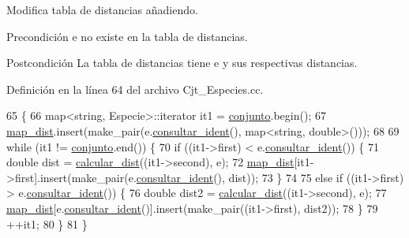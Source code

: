Modifica tabla de distancias añadiendo. 

\begin{DoxyPrecond}{Precondición}
\textquotesingle{}e\textquotesingle{} no existe en la tabla de distancias. 
\end{DoxyPrecond}
\begin{DoxyPostcond}{Postcondición}
La tabla de distancias tiene \textquotesingle{}e\textquotesingle{} y sus respectivas distancias. 
\end{DoxyPostcond}


Definición en la línea 64 del archivo Cjt\+\_\+\+Especies.\+cc.


\begin{DoxyCode}
65 \{
66     map<string, Especie>::iterator it1 = \hyperlink{class_cjt___especies_a82ed53cbd620caca3db6b5c20b37a60a}{conjunto}.begin();
67     \hyperlink{class_cjt___especies_a9b104014aea0c1472ba4e7d7fc785e9a}{map\_dist}.insert(make\_pair(e.\hyperlink{class_especie_a2c3f4a6aa3337ce1fa7e8c7d5be73c50}{consultar\_ident}(), map<string, double>()));    
68 
69     \textcolor{keywordflow}{while} (it1 != \hyperlink{class_cjt___especies_a82ed53cbd620caca3db6b5c20b37a60a}{conjunto}.end()) \{
70         \textcolor{keywordflow}{if} ((it1->first) < e.\hyperlink{class_especie_a2c3f4a6aa3337ce1fa7e8c7d5be73c50}{consultar\_ident}()) \{
71             \textcolor{keywordtype}{double} dist = \hyperlink{class_cjt___especies_a318c7df32ed58b513c623668772c3f84}{calcular\_dist}((it1->second), e);
72             \hyperlink{class_cjt___especies_a9b104014aea0c1472ba4e7d7fc785e9a}{map\_dist}[it1->first].insert(make\_pair(e.\hyperlink{class_especie_a2c3f4a6aa3337ce1fa7e8c7d5be73c50}{consultar\_ident}(), dist));
73         \}
74 
75         \textcolor{keywordflow}{else} \textcolor{keywordflow}{if} ((it1->first) > e.\hyperlink{class_especie_a2c3f4a6aa3337ce1fa7e8c7d5be73c50}{consultar\_ident}()) \{
76             \textcolor{keywordtype}{double} dist2 = \hyperlink{class_cjt___especies_a318c7df32ed58b513c623668772c3f84}{calcular\_dist}((it1->second), e);
77             \hyperlink{class_cjt___especies_a9b104014aea0c1472ba4e7d7fc785e9a}{map\_dist}[e.\hyperlink{class_especie_a2c3f4a6aa3337ce1fa7e8c7d5be73c50}{consultar\_ident}()].insert(make\_pair((it1->first), dist2));
78         \}
79         ++it1;
80     \}
81 \}
\end{DoxyCode}
\mbox{\label{class_cjt___especies_a32f9d2fb3c0cf9800d6d7492977beea6}} 

